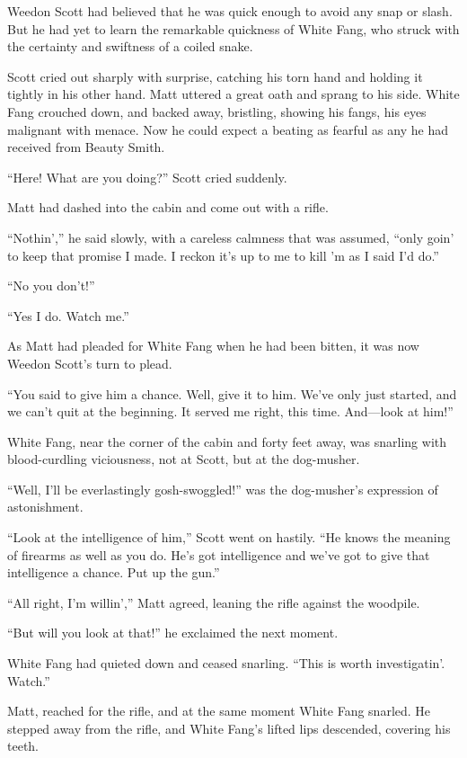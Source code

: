 \documentclass[10pt]{book}
\begin{document}
Weedon Scott had believed that he was quick enough to avoid any snap or
slash. But he had yet to learn the remarkable quickness of White Fang,
who struck with the certainty and swiftness of a coiled snake.

Scott cried out sharply with surprise, catching his torn hand and
holding it tightly in his other hand. Matt uttered a great oath and
sprang to his side. White Fang crouched down, and backed away,
bristling, showing his fangs, his eyes malignant with menace. Now he
could expect a beating as fearful as any he had received from Beauty
Smith.

“Here! What are you doing?” Scott cried suddenly.

Matt had dashed into the cabin and come out with a rifle.

“Nothin’,” he said slowly, with a careless calmness that was assumed,
“only goin’ to keep that promise I made. I reckon it’s up to me to kill
’m as I said I’d do.”

“No you don’t!”

“Yes I do. Watch me.”

As Matt had pleaded for White Fang when he had been bitten, it was now
Weedon Scott’s turn to plead.

“You said to give him a chance. Well, give it to him. We’ve only just
started, and we can’t quit at the beginning. It served me right, this
time. And—look at him!”

White Fang, near the corner of the cabin and forty feet away, was
snarling with blood-curdling viciousness, not at Scott, but at the
dog-musher.

“Well, I’ll be everlastingly gosh-swoggled!” was the dog-musher’s
expression of astonishment.

“Look at the intelligence of him,” Scott went on hastily. “He knows the
meaning of firearms as well as you do. He’s got intelligence and we’ve
got to give that intelligence a chance. Put up the gun.”

“All right, I’m willin’,” Matt agreed, leaning the rifle against the
woodpile.

“But will you look at that!” he exclaimed the next moment.

White Fang had quieted down and ceased snarling. “This is worth
investigatin’. Watch.”

Matt, reached for the rifle, and at the same moment White Fang snarled.
He stepped away from the rifle, and White Fang’s lifted lips descended,
covering his teeth.
\end{document}
